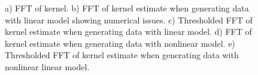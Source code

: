 \documentclass[conference]{IEEEtran}
\begin{document}
\begin{figure}
{	\label{fig:FFTKernelEstimateThreshLinear}}
	\label{fig:FFTKernels}
	\caption{a) FFT of kernel. b) FFT of kernel estimate when generating data with linear model showing numerical issues. c) Thresholded FFT of kernel estimate when generating data with linear model. d) FFT of kernel estimate when generating data with nonlinear model. e) Thresholded FFT of kernel estimate when generating data with nonlinear linear model.}
\end{figure}
\end{document}

